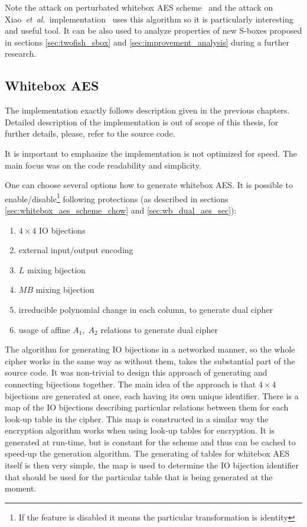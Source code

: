 \documentclass[11pt,oneside,final]{fithesis2}
\newcommand{\eal}{\emph{et~al.}}
\begin{document}
    Note the attack on perturbated whitebox AES scheme~\citep{conf/indocrypt/MulderWP10} 
    and the attack on Xiao~\eal\ implementation~\citep{conf/sacrypt/MulderRP12} uses this algorithm so it is particularly interesting and useful tool. It can be also used to analyze properties
    of new S-boxes proposed in sections \ref{sec:twofish_sbox} and \ref{sec:improvement_analysis} during a further research.
    
    \subsection{Whitebox AES}
    The implementation exactly follows description given in the previous chapters. Detailed description of the implementation is out of scope of this thesis, 
    for further details, please, refer to the source code. 
    
    It is important to emphasize the implementation is not optimized for speed. The main focus was on the code readability and simplicity.
    
    One can choose several options how to generate whitebox AES. It is possible to 
    enable/disable\footnote{If the feature is disabled it means the particular transformation is identity} following protections 
    (as described in sections \ref{sec:whitebox_aes_scheme_chow} and \ref{sec:wb_dual_aes_sec}):
    \begin{enumerate}
     \item $4\times4$ IO bijections
     \item external input/output encoding
     \item $L$ mixing bijection
     \item $MB$ mixing bijection
     \item irreducible polynomial change in each column, to generate dual cipher
     \item usage of affine $A_1,\;A_2$ relations to generate dual cipher
    \end{enumerate}
    
    The algorithm for generating IO bijections in a networked manner, so the whole cipher works
    in the same way as without them, takes the substantial part of the source code. It was non-trivial to design this approach 
    of generating and connecting bijections together. The main idea of the approach
    is that $4\times4$ bijections are generated at once, each having its own unique identifier. 
    There is a map of the IO bijections describing particular relations between them for each look-up table in the cipher. This map is constructed in a 
    similar way the encryption algorithm works when using look-up tables for encryption. It is generated at run-time, but is constant for the scheme
    and thus can be cached to speed-up the generation algorithm. The generating of tables for whitebox AES itself is then very simple, the map is used to determine 
    the IO bijection identifier that should be used for the particular table that is being generated at the moment.
    
\end{document}
